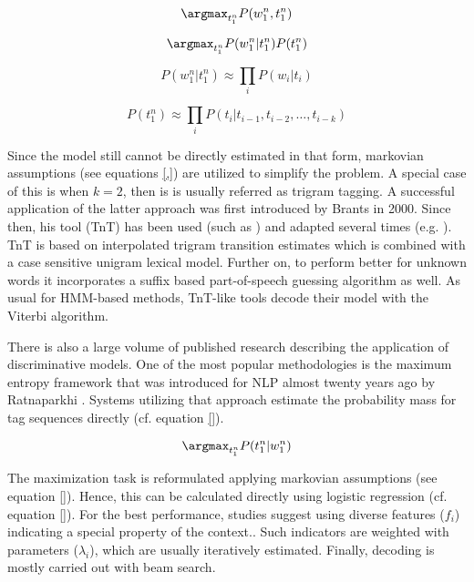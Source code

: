 \begin{equation}
\argmax_{t_1^n} P(w_1^n, t_1^n)
\end{equation}

\begin{equation}
\argmax_{t_1^n}  P(w_1^n|t_1^n) P(t_1^n)
\end{equation}

\begin{equation}
P(w_1^n|t_1^n) \approx \prod_i P(w_i|t_i)
\end{equation}

\begin{equation}
P(t_1^n) \approx \prod_i P(t_i|t_{i-1}, t_{i-2}, \dots, t_{i-k})
\end{equation}

Since the model still cannot be directly estimated in that form, markovian assumptions (see equations \eqref{,}) are utilized to simplify the problem. A special case of this is when $k=2$, then is is usually referred as trigram tagging. A successful application of the latter approach was first introduced by Brants \cite{} in 2000. Since then, his tool (TnT) has been used (such as \cite{}) and adapted several times (e.g. \cite{IceNLP,Finntagger,Hunpos,Oravecz}). TnT is based on interpolated trigram transition estimates which is combined with a case sensitive unigram lexical model. Further on, to perform better for unknown words it incorporates a suffix based part-of-speech guessing algorithm as well. As usual for HMM-based methods, TnT-like tools decode their model with the Viterbi algorithm. 

There is also a large volume of published research describing the application of discriminative models. One of the most popular methodologies is the maximum entropy framework that was introduced for NLP almost twenty years ago by Ratnaparkhi \cite{}. Systems utilizing that approach estimate the probability mass for tag sequences directly (cf. equation \eqref{}).

\begin{equation}
\argmax_{t_1^n} P(t_1^n | w_1^n)
\end{equation}

The maximization task is reformulated applying markovian assumptions (see equation \eqref{}). Hence, this can be calculated directly using logistic regression (cf.  equation \eqref{}). For the best performance, studies suggest using diverse features ($f_i$) indicating a special property of the context.. Such indicators are weighted with parameters ($\lambda_i$), which are usually iteratively estimated. Finally, decoding is mostly carried out with beam search.

